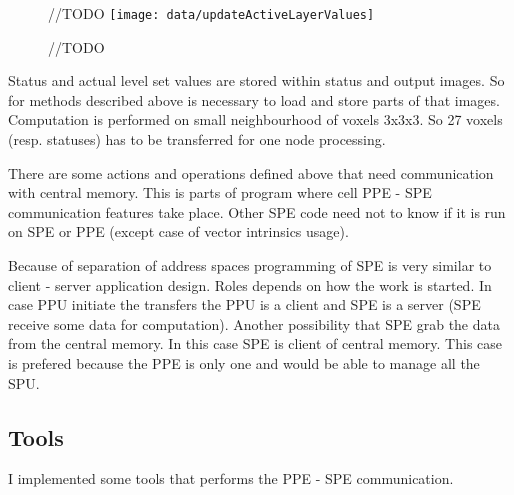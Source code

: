 \begin{figure}	//TODO
    \centering
    \texttt{[image: data/updateActiveLayerValues]}
    \caption[Diagram of new design components]{//TODO}
    \label{fg:updateActiveLayerValues}
\end{figure}

Status and actual level set values are stored within status and output images.
So for methods described above is necessary to load and store parts of that images.
Computation is performed on small neighbourhood of voxels 3x3x3.
So 27 voxels (resp. statuses) has to be transferred for one node processing.

There are some actions and operations defined above that need communication with central memory.
This is parts of program where cell PPE - SPE communication features take place.
Other SPE code need not to know if it is run on SPE or PPE (except case of vector intrinsics usage).

Because of separation of address spaces programming of SPE is very similar to client - server application design.
Roles depends on how the work is started.
In case PPU initiate the transfers the PPU is a client and SPE is a server (SPE receive some data for computation).
Another possibility that SPE grab the data from the central memory.
In this case SPE is client of central memory.
This case is prefered because the PPE is only one and would be able to manage all the SPU.

\subsection{Tools}
I implemented some tools that performs the PPE - SPE communication.

